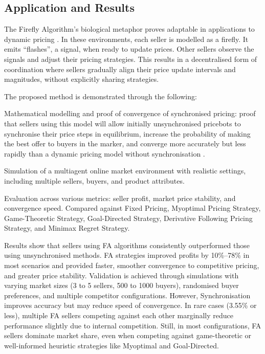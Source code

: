 \documentclass[a4paper, 12pt]{extarticle}
\begin{document}
\subsection{Application and Results} 

The Firefly Algorithm’s biological metaphor proves adaptable in applications to dynamic pricing \cite{jumadinova2008firefly}. In these environments, each seller is modelled as a firefly. It emits “flashes”, a signal, when ready to update prices. Other sellers observe the signals and adjust their pricing strategies. This results in a decentralised form of coordination where sellers gradually align their price update intervals and magnitudes, without explicitly sharing strategies. 

The proposed method is demonstrated through the following: 

Mathematical modelling and proof of convergence of synchronised pricing: proof that sellers using this model will allow initially unsynchronised pricebots to synchronise their price steps in equilibrium, increase the probability of making the best offer to buyers in the marker, and converge more accurately but less rapidly than a dynamic pricing model without synchronisation \cite{jumadinova2008firefly}. 

Simulation of a multiagent online market environment with realistic settings, including multiple sellers, buyers, and product attributes. 

Evaluation across various metrics: seller profit, market price stability, and convergence speed. Compared against Fixed Pricing, Myoptimal Pricing Strategy, Game-Theoretic Strategy, Goal-Directed Strategy, Derivative Following Pricing Strategy, and Minimax Regret Strategy. 

Results show that sellers using FA algorithms consistently outperformed those using unsynchronised methods. FA strategies improved profits by 10\%–78\% in most scenarios and provided faster, smoother convergence to competitive pricing, and greater price stability. Validation is achieved through simulations with varying market sizes (3 to 5 sellers, 500 to 1000 buyers), randomised buyer preferences, and multiple competitor configurations. However, Synchronisation improves accuracy but may reduce speed of convergence. In rare cases (3.55\% or less), multiple FA sellers competing against each other marginally reduce performance slightly due to internal competition. Still, in most configurations, FA sellers dominate market share, even when competing against game-theoretic or well-informed heuristic strategies like Myoptimal and Goal-Directed. 
\end{document}
